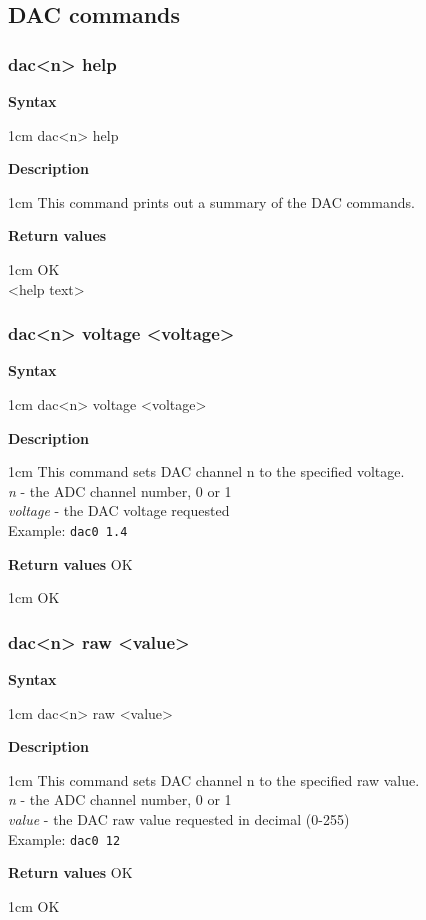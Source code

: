 \documentclass{article}[a4paper]
\begin{document}
\subsection{DAC commands}
\subsubsection{dac<n> help}
\begin{tcolorbox}
	{\bf Syntax}

	 1cm \dimexpr\linewidth-2cm\relax
	dac<n> help

	\medskip
	{\bf Description}

	 1cm \dimexpr\linewidth-2cm\relax
	This command prints out a summary of the DAC commands.

	\medskip
	{\bf Return values}

	 1cm \dimexpr\linewidth-2cm\relax
	OK \\
	<help text>
\end{tcolorbox}

\subsubsection{dac<n> voltage <voltage>}
\begin{tcolorbox}
	{\bf Syntax}

	 1cm \dimexpr\linewidth-2cm\relax
	dac<n> voltage <voltage>

	\medskip
	{\bf Description}

	 1cm \dimexpr\linewidth-2cm\relax
	This command sets DAC channel n to the specified voltage. \\
	\medskip
	{\it n} - the ADC channel number, 0 or 1 \\
	{\it voltage} - the DAC voltage requested \\
	\medskip
	Example: \texttt{dac0 1.4}

	\medskip
	{\bf Return values}
	OK

	 1cm \dimexpr\linewidth-2cm\relax
	OK
\end{tcolorbox}

\subsubsection{dac<n> raw <value>}
\begin{tcolorbox}
	{\bf Syntax}

	 1cm \dimexpr\linewidth-2cm\relax
	dac<n> raw <value>

	\medskip
	{\bf Description}

	 1cm \dimexpr\linewidth-2cm\relax
	This command sets DAC channel n to the specified raw value. \\
	\medskip
	{\it n} - the ADC channel number, 0 or 1 \\
	{\it value} - the DAC raw value requested in decimal (0-255) \\
	\medskip
	Example: \texttt{dac0 12}

	\medskip
	{\bf Return values}
	OK

	 1cm \dimexpr\linewidth-2cm\relax
	OK
\end{tcolorbox}
\end{document}

